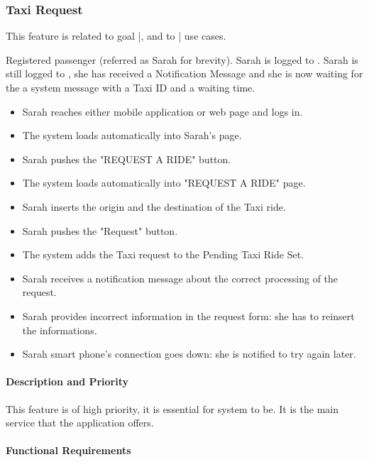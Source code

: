 \subsubsection{Taxi Request}
This feature is related to goal |, and to | use cases.
\begin{itemize}
	 Registered passenger (referred as Sarah for brevity).
	 Sarah is logged to \myTaxiService{}.
	 Sarah is still logged to \myTaxiService{}, she has received a Notification Message and she is now waiting for the a system message with a Taxi ID and a waiting time.
	\begin{itemize}
		\item Sarah reaches either \myTaxiService{} mobile application or web page and logs in.
		\item The system loads automatically into Sarah's page.
		\item Sarah pushes the "REQUEST A RIDE" button.
		\item The system loads automatically into "REQUEST A RIDE" page.
		\item Sarah inserts the origin and the destination of the Taxi ride.
		\item Sarah pushes the "Request" button.
		\item The system adds the Taxi request to the Pending Taxi Ride Set.
		\item Sarah receives a notification message about the correct processing of the request. 
	\end{itemize}
	\begin{itemize}
		\item Sarah provides incorrect information in the request form: she has to reinsert the informations.
		\item Sarah smart phone's connection goes down: she is notified to try again later.
	\end{itemize}
\end{itemize}
\paragraph{Description and Priority}
This feature is of high priority, it is essential for \myTaxiService{} system to be. It is the main service that the application offers.
\paragraph{Functional Requirements}
\begin{itemize}
\end{itemize}

